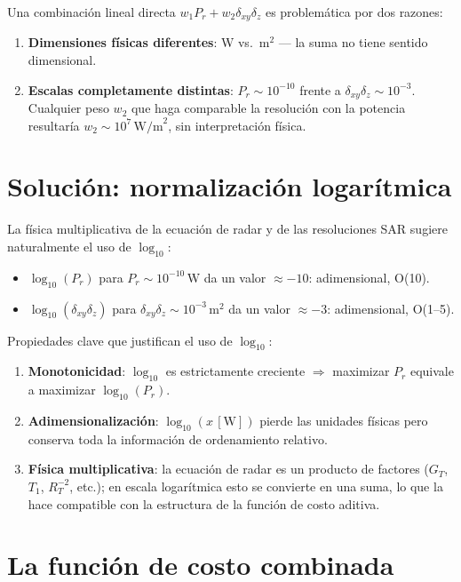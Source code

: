 \documentclass[12pt,a4paper,oneside]{book}
\newcommand{\RT}{R_T}
\newcommand{\Prcv}{P_r}
\newcommand{\dxy}{\delta_{xy}}
\newcommand{\dz}{\delta_z}
\begin{document}
Una combinación lineal directa $w_1\Prcv + w_2\dxy\dz$ es problemática por dos razones:

\begin{enumerate}
  \item \textbf{Dimensiones físicas diferentes}: W vs.\ m$^2$ — la suma no tiene sentido dimensional.
  \item \textbf{Escalas completamente distintas}: $\Prcv\sim 10^{-10}$ frente a $\dxy\dz\sim 10^{-3}$.
    Cualquier peso $w_2$ que haga comparable la resolución con la potencia resultaría
    $w_2 \sim 10^7\,\text{W/m}^2$, sin interpretación física.
\end{enumerate}

\section{Solución: normalización logarítmica}

La física multiplicativa de la ecuación de radar y de las resoluciones SAR sugiere naturalmente el uso de $\log_{10}$:

\begin{itemize}
  \item $\log_{10}(\Prcv)$ para $\Prcv \sim 10^{-10}\,\text{W}$ da un valor $\approx -10$: adimensional, O(10).
  \item $\log_{10}(\dxy\dz)$ para $\dxy\dz \sim 10^{-3}\,\text{m}^2$ da un valor $\approx -3$: adimensional, O(1--5).
\end{itemize}

Propiedades clave que justifican el uso de $\log_{10}$:
\begin{enumerate}
  \item \textbf{Monotonicidad}: $\log_{10}$ es estrictamente creciente $\Rightarrow$ maximizar $\Prcv$ equivale a maximizar $\log_{10}(\Prcv)$.
  \item \textbf{Adimensionalización}: $\log_{10}(x\,[\text{W}])$ pierde las unidades físicas pero conserva toda la información de ordenamiento relativo.
  \item \textbf{Física multiplicativa}: la ecuación de radar es un producto de factores ($G_T$, $T_1$, $\RT^{-2}$, etc.); en escala logarítmica esto se convierte en una suma, lo que la hace compatible con la estructura de la función de costo aditiva.
\end{enumerate}

\section{La función de costo combinada}
\end{document}

